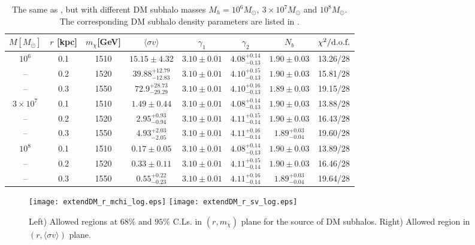 \begin{table}[htbp]
	\centering
		\begin{tabular}{ccc|cccc|c}
		\hline\hline
		 $M [M_\odot]$ & $r$ [kpc] & $m_\chi$[GeV] & $\langle \sigma v \rangle$  & $\gamma_1$ & $\gamma_2$ & $N_b$  & $\chi^2/\text{d.o.f.}$ \\
		  \hline
				$10^6$ & 0.1& 1510 & $ 15.15\pm4.32$  & $3.10\pm0.01$ & $4.08^{+0.14}_{-0.13}$ & $1.90\pm0.03$ & 13.26/28\\
		-- & 0.2 &1520 & $39.88^{+12.79}_{-12.83}$ & $3.10\pm0.01$& $4.10^{+0.15}_{-0.13}$&  $1.90\pm0.03$ & 15.81/28\\
		-- & 0.3 &1550 & $72.9^{+28.73}_{-29.29}$ & $3.10\pm0.01$& $4.10^{+0.16}_{-0.13}$& $1.89\pm0.03$& 19.15/28\\ 
		\hline
		$3\times10^7$ & 0.1& 1510 & $ 1.49\pm0.44$  & $3.10\pm0.01$ & $4.08^{+0.14}_{-0.13}$ & $1.90\pm0.03$ & 13.88/28\\
		-- & 0.2 &1520 & $2.95^{+0.93}_{-0.94}$ & $3.10\pm0.01$& $4.11^{+0.15}_{-0.14}$&  $1.90\pm0.03$ & 16.43/28\\
		-- & 0.3 &1550 & $4.93^{+2.03}_{-2.05}$ & $3.10\pm0.01$& $4.11^{+0.16}_{-0.14}$& $1.89^{+0.03}_{-0.04}$& 19.60/28\\
		\hline
		$10^8$ & 0.1& 1510 & $ 0.17\pm0.05$  & $3.10\pm0.01$ & $4.08^{+0.14}_{-0.13}$ & $1.90\pm0.03$ & 13.89/28\\
		-- & 0.2 &1520 & $ 0.33\pm0.11$ & $3.10\pm0.01$& $4.11^{+0.15}_{-0.14}$&  $1.90\pm0.03$ & 16.46/28\\
		-- & 0.3 &1550 & $0.55^{+0.22}_{-0.23}$ & $3.10\pm0.01$& $4.11^{+0.16}_{-0.14}$& $1.89^{+0.03}_{-0.04}$& 19.64/28\\
		\hline\hline
		\end{tabular}
	\caption{
	The same as , but with different DM subhalo masses
	$M_{h}=10^{6} M_{\odot},~3\times 10^{7}M_{\odot}$ and $10^{8} M_{\odot}$.
	The corresponding DM subhalo density parameters are listed
	in .
	 }
\label{tab:extendDM2}
\end{table}


\begin{figure}[htb]
	\centering
	\texttt{[image: extendDM\_r\_mchi\_log.eps]}
	\texttt{[image: extendDM\_r\_sv\_log.eps]}
	\caption{		
	Left) 
	Allowed regions at $68\%$ and $95\%$ C.Ls. in $(r, m_{\chi})$ plane for 
	the source of DM subhalos.
	Right)
	Allowed region in $(r, \langle \sigma v\rangle)$ plane.	
	}\label{fig:extendDM-contour}
\end{figure}

